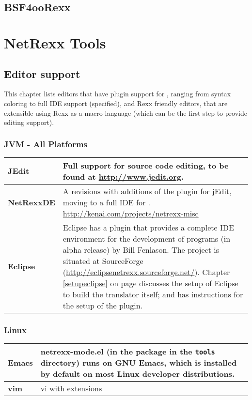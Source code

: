 {\section{BSF4ooRexx}

\chapter{NetRexx Tools}
\section{Editor support}\label{editors}
This chapter lists editors that have plugin support for \nr{},
ranging from syntax coloring to full IDE support (specified), and
Rexx friendly editors, that are extensible using Rexx as a macro
language (which can be the first step to provide \nr{} editing support).
\subsection{JVM - All Platforms}
\begin{tabularx}{\textwidth}{>{\bfseries}lX}
\toprule
JEdit & Full support for \nr{} source code editing, to be found at
\url{http://www.jedit.org}.
\\\midrule
NetRexxDE & A revisions with additions of the \nr{} plugin for
jEdit, moving to a full IDE for \nr{}. \url{http://kenai.com/projects/netrexx-misc} 
\\\midrule
Eclipse & Eclipse has a \nr{} plugin that provides a complete IDE
environment for the development of \nr{} programs (in alpha release)
by Bill Fenlason. The project is situated at SourceForge
(\url{http://eclipsenetrexx.sourceforge.net/}). Chapter
\ref{setupeclipse} on page \pageref{setupeclipse} discusses the setup
of Eclipse to build the translator itself; and has
instructions for the setup of the \nr{} plugin.
\\\bottomrule
\end{tabularx}
\subsection{Linux}
\begin{tabularx}{\textwidth}{>{\bfseries}lX}
\toprule
Emacs & netrexx-mode.el (in the \nr{} package in the \texttt{tools}
directory) runs on GNU Emacs, which is installed by default on most
Linux developer distributions.
\\\midrule
vim & vi with extensions
\\\bottomrule
\end{tabularx}
}
